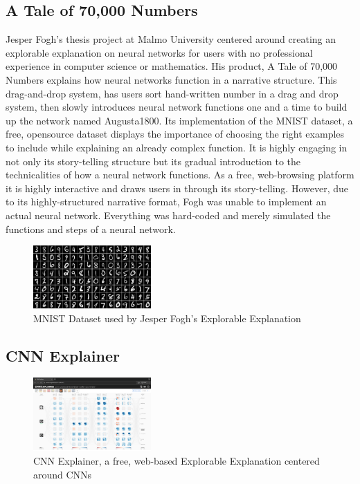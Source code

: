 \documentclass[10pt,twocolumn]{article}
\begin{document}
\subsection{A Tale of 70,000 Numbers}
Jesper Fogh's thesis project at Malmo University centered around creating an explorable explanation on neural networks for users with no professional experience in computer science or mathematics. His product, A Tale of 70,000 Numbers explains how neural networks function in a narrative structure. This drag-and-drop system, has users sort hand-written number in a drag and drop system, then slowly introduces neural network functions one and a time to build up the network named Augusta1800. Its implementation of the MNIST dataset, a free, opensource dataset displays the importance of choosing the right examples to include while explaining an already complex function. It is highly engaging in not only its story-telling structure but its gradual introduction to the technicalities of how a neural network functions. As a free, web-browsing platform it is highly interactive and draws users in through its story-telling. However, due to its highly-structured narrative format, Fogh was unable to implement an actual neural network. Everything was hard-coded and merely simulated the functions and steps of a neural network. \cite{ExplorableExplanation}
\begin{figure}[h]
\caption{MNIST Dataset used by Jesper Fogh's Explorable Explanation}
\centering
\includegraphics[width=0.4\textwidth]{./Images/mnistDataset.png}
\end{figure}

\subsection{CNN Explainer}

\begin{figure}[h]
\caption{CNN Explainer, a free, web-based Explorable Explanation centered around CNNs}
\centering
\includegraphics[width=0.4\textwidth]{./Images/CNNExplorer.png}
\end{figure}
\end{document}
